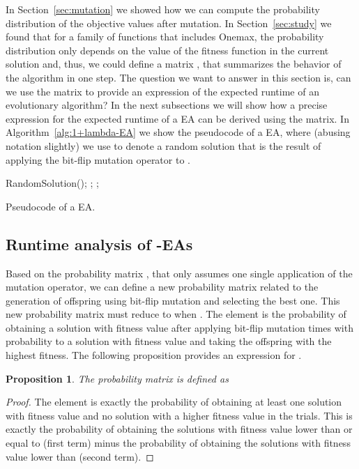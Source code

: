\documentclass{article}
\newtheorem{proposition}{Proposition}
\begin{document}
In Section~\ref{sec:mutation} we showed how we can compute the probability distribution of the objective values after mutation. In Section~\ref{sec:study} we found that for a family of functions that includes Onemax, the probability distribution only depends on the value of the fitness function in the current solution and, thus, we could define a matrix , that summarizes the behavior of the algorithm in one step. The question we want to answer in this section is, can we use the  matrix to provide an expression of the expected runtime of an evolutionary algorithm? In the next subsections we will show how a precise expression for the expected runtime of a  EA can be derived using the  matrix. In Algorithm~\ref{alg:1+lambda-EA} we show the pseudocode of a  EA, where (abusing notation slightly) we use  to denote a random solution that is the result of applying the bit-flip mutation operator to .

\begin{algorithm}[!ht]
\begin{algorithmic}
\STATE   RandomSolution();
\STATE ;
\IF{}
\STATE ;
\ENDIF 
\ENDFOR
\ENDWHILE
\end{algorithmic}
\caption{Pseudocode of a  EA.}
\label{alg:1+lambda-EA}
\end{algorithm}



\subsection{Runtime analysis of -EAs}


Based on the probability matrix , that only assumes one single application of the mutation operator, we can define a new probability matrix  related to the generation of  offspring using bit-flip mutation and selecting the best one. This new probability matrix must reduce to  when . The element  is the probability of obtaining a solution with fitness value  after applying bit-flip mutation  times with probability  to a solution with fitness value  and taking the offspring with the highest fitness. The following proposition provides an expression for .

\begin{proposition}
The probability matrix  is defined as

\end{proposition}
\begin{proof}
The element  is exactly the probability of obtaining at least one solution with fitness value  and no solution with a higher fitness value in the  trials. This is exactly the probability of obtaining the  solutions with fitness value lower than or equal to  (first term) minus the probability of obtaining the solutions with fitness value lower than  (second term).
\end{proof}
\end{document}
